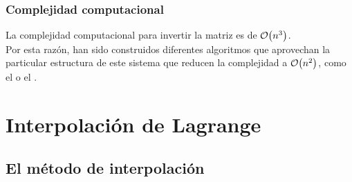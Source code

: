 \documentclass[12pt]{beamer}
\begin{document}
\begin{frame}
\frametitle{Complejidad computacional}
La complejidad computacional para invertir la matriz es de $\order{n^{3}}$.
\\
\bigskip
\pause
Por esta razón, han sido construidos diferentes algoritmos que aprovechan la particular estructura de este sistema que reducen la complejidad a $\order{n^{2}}$, \pause como el  \pause o el .
\end{frame}

\section{Interpolación de Lagrange}
\subsection{El método de interpolación}
\end{document}
